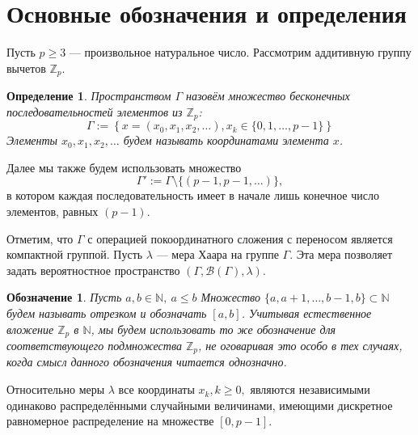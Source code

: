 \documentclass[14pt, a4paper, russian]{report}
\newtheorem{definition}{\indent Определение}
\newtheorem{notation}{\indent Обозначение}
\begin{document}
\section{Основные обозначения и определения}

Пусть $p \ge 3$ --- произвольное натуральное число. Рассмотрим аддитивную группу вычетов $\mathbb{Z}_p$. 

\begin{definition}
Пространством $\Gamma$ назовём множество бесконечных последовательностей элементов из $\mathbb{Z}_p$:
$$\Gamma := \left\{x = \left(x_0, x_1, x_2, \ldots \right), x_k \in \{0, 1, \ldots, p - 1\} \right\}$$
Элементы $x_0, x_1, x_2, \ldots$ будем называть координатами элемента $x$.
\end{definition}
Далее мы также будем использовать множество 
$$\Gamma' := \Gamma \setminus \{(p-1,p-1,\ldots)\},$$
в котором каждая последовательность имеет в начале лишь конечное число элементов, равных $(p-1)$.

Отметим, что $\Gamma$ с операцией покоординатного сложения с переносом является компактной группой. Пусть $\lambda$ --- мера Хаара на группе $\Gamma$. Эта мера позволяет задать вероятностное пространство $(\Gamma, \mathcal{B}(\Gamma), \lambda)$.

\begin{notation} 
Пусть $a, b \in \mathbb{N},\ a \le b$ Множество $\{a, a+1, \ldots, b-1, b\} \subset \mathbb{N}$ будем называть отрезком и обозначать $\left[a, b\right]$. Учитывая естественное вложение $\mathbb{Z}_p$ в $\mathbb{N}$, мы будем использовать то же обозначение для соответствующего подмножества $\mathbb{Z}_p$, не оговаривая это особо в тех случаях, когда смысл данного обозначения читается однозначно.
\end{notation}

Относительно меры $\lambda$ все координаты $x_k, k \ge 0,$ являются независимыми одинаково распределёнными случайными величинами, имеющими дискретное равномерное распределение на множестве $\left[0, p-1\right]$. 
\end{document}
